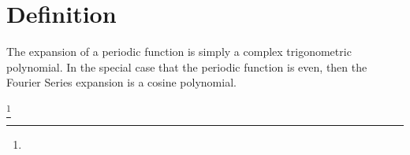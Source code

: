 \section{Definition}
The  expansion of a periodic function
is simply a complex trigonometric polynomial.
In the special case that the periodic function is even,
then the Fourier Series expansion is a cosine polynomial.

\begin{definition}
\footnote{
  }
\label{def:fs}
\label{def:opFS}
\end{definition}

